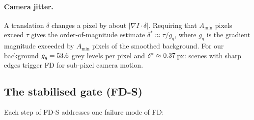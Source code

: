 \documentclass[12pt,a4paper]{article}
\theoremstyle{plain}
\theoremstyle{definition}
\newcommand{\FD}{FD}
\newcommand{\FDS}{FD-S}
\begin{document}
\paragraph{Camera jitter.} A translation $\delta$ changes a pixel by about $|\nabla I\cdot\delta|$. Requiring that $A_{\min}$ pixels exceed $\tau$ gives the order-of-magnitude estimate $\delta^*\approx\tau/g_q$, where $g_q$ is the gradient magnitude exceeded by $A_{\min}$ pixels of the smoothed background. For our background $g_q=53.6$ grey levels per pixel and $\delta^*\approx0.37$\,px: scenes with sharp edges trigger \FD{} for sub-pixel camera motion.

\subsection{The stabilised gate (\FDS)}\label{sec:fds}
Each step of \FDS{} addresses one failure mode of \FD:
\end{document}
